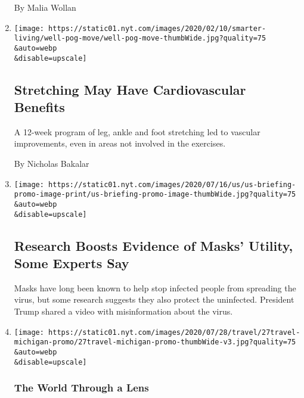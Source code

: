 \begin{enumerate}
  By Malia Wollan
\item
  \href{/2020/07/27/well/move/stretching-heart-cardiovascular-health.html}{}

  \texttt{[image: https://static01.nyt.com/images/2020/02/10/smarter-living/well-pog-move/well-pog-move-thumbWide.jpg?quality=75\\\&auto=webp\\\&disable=upscale]}

  \hypertarget{stretching-may-have-cardiovascular-benefits}{%
  \subsection{Stretching May Have Cardiovascular
  Benefits}\label{stretching-may-have-cardiovascular-benefits}}

  A 12-week program of leg, ankle and foot stretching led to vascular
  improvements, even in areas not involved in the exercises.

  By Nicholas Bakalar
\item
  \href{/2020/07/27/world/coronavirus-covid-19.html}{}

  \texttt{[image: https://static01.nyt.com/images/2020/07/16/us/us-briefing-promo-image-print/us-briefing-promo-image-thumbWide.jpg?quality=75\\\&auto=webp\\\&disable=upscale]}

  \hypertarget{research-boosts-evidence-of-masks-utility-some-experts-say}{%
  \subsection{Research Boosts Evidence of Masks' Utility, Some Experts
  Say}\label{research-boosts-evidence-of-masks-utility-some-experts-say}}

  Masks have long been known to help stop infected people from spreading
  the virus, but some research suggests they also protect the
  uninfected. President Trump shared a video with misinformation about
  the virus.
\item
  \href{/2020/07/27/travel/moose-michigan-isle-royale.html}{}

  \texttt{[image: https://static01.nyt.com/images/2020/07/28/travel/27travel-michigan-promo/27travel-michigan-promo-thumbWide-v3.jpg?quality=75\\\&auto=webp\\\&disable=upscale]}

  \hypertarget{the-world-through-a-lens}{%
  \subsubsection{The World Through a
  Lens}\label{the-world-through-a-lens}}


\end{enumerate}
